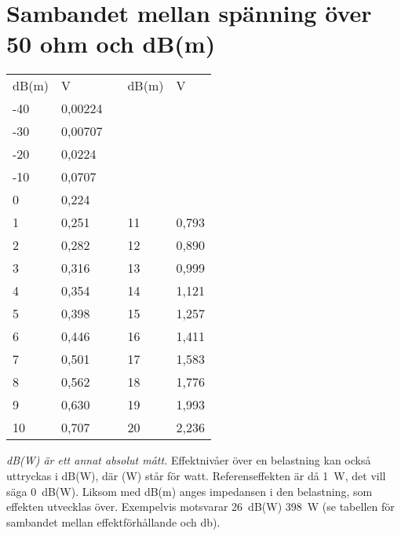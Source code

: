 \section{Sambandet mellan spänning över 50 ohm och dB(m)}

\begin{center}
\begin{tabular}{l|lp{1cm}l|l}
  dB(m) & V & & dB(m) & V \\
  \cline{1-2} \cline{4-5}
  -40 & 0,00224 & & & \\
  -30 & 0,00707 & & & \\
  -20 & 0,0224  & & & \\
  -10 & 0,0707  & & & \\
  0   & 0,224   & & & \\
  1   & 0,251   & & 11 & 0,793 \\
  2   & 0,282   & & 12 & 0,890 \\
  3   & 0,316   & & 13 & 0,999 \\
  4   & 0,354   & & 14 & 1,121 \\
  5   & 0,398   & & 15 & 1,257 \\
  6   & 0,446   & & 16 & 1,411 \\
  7   & 0,501   & & 17 & 1,583 \\
  8   & 0,562   & & 18 & 1,776 \\
  9   & 0,630   & & 19 & 1,993 \\
  10  & 0,707   & & 20 & 2,236 \\
\end{tabular}
\end{center}

\emph{dB(W) är ett annat absolut mått.}
Effektnivåer över en belastning kan också uttryckas i dB(W), där (W) står
för watt.
Referenseffekten är då \SI{1}{\watt}, det vill säga 0~dB(W).
Liksom med dB(m) anges impedansen i den belastning, som effekten utvecklas
över.
Exempelvis motsvarar 26~dB(W) 398~W (se tabellen för sambandet mellan
effektförhållande och \si{\decibel}).
